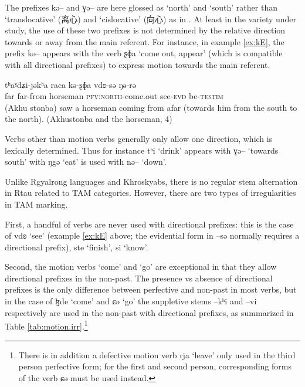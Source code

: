 \documentclass[oneside,a4paper,11pt]{article}
\newcommand{\ipa}[1]{{\phon #1}} %
\newcommand{\zh}[1]{{\cn #1}}
\begin{document}
The prefixes \ipa{kə--} and \ipa{ɣə--} are here glossed as `north' and `south' rather than `translocative' (\zh{离心}) and  `cislocative' (\zh{向心}) as in \citet[26]{huangbf91daofu}. At least in the variety under study, the  use of these two prefixes is not determined by the relative direction towards or away from the main referent. For instance, in example \ref{ex:kE},   the prefix \ipa{kə--} appears with  the verb \ipa{ʂɸa} `come out, appear' (which is compatible with all directional prefixes) to express motion towards the main referent.

\begin{exe}
\ex \label{ex:kE}
\gll 	\ipa{tʰaˠdʑi}  	\ipa{tʰaˠdʑi-jəkʰa}  	\ipa{raca}  	\ipa{kə-ʂɸa}  	\ipa{vdʚ-sə}  	\ipa{ŋə-rə}  \\
far far-from horseman \textsc{pfv:north}-come.out see-\textsc{evd} be-\textsc{testim} \\
\glt (Akhu stonba) saw  a horseman coming from afar (towards him from the south to the north). (Akhustonba and the horseman, 4)
\end{exe}

Verbs other than motion verbs generally  only allow one direction, which is lexically determined. Thus for instance \ipa{tʰi} `drink' appears with \ipa{ɣə--} `towards south' with \ipa{ŋgə} `eat' is used with \ipa{nə--} `down'.

Unlike Rgyalrong languages and Khroskyabs, there is no regular stem alternation in Rtau related to TAM categories. However, there are two types of irregularities in TAM marking.

First, a handful of verbs are never used with directional prefixes: this is the case of \ipa{vdʚ} `see' (example \ref{ex:kE} above; the evidential form in --\ipa{sə} normally requires a directional prefix), \ipa{ste} `finish', \ipa{si} `know'.

Second, the motion verbs `come' and `go' are exceptional in that they allow directional prefixes in the non-past. The presence vs absence of directional prefixes is the only difference between perfective and non-past in most verbs, but in the case of \ipa{ɮde} `come' and \ipa{ɕə} `go' the suppletive stems  \ipa{--kʰi} and \ipa{--vi} respectively are used in the non-past with directional prefixes, as summarized in Table \ref{tab:motion.irr}.\footnote{There is in addition a defective motion verb \ipa{rja} `leave' only used in the third person perfective form; for the first and second person, corresponding forms of the verb \ipa{ɕə} must be used instead.}
\end{document}
